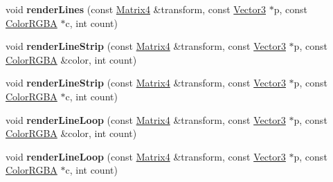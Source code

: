 \begin{DoxyCompactItemize}
\item 
void {\bfseries render\+Lines} (const \hyperlink{class_i_dream_sky_1_1_matrix4}{Matrix4} \&transform, const \hyperlink{class_i_dream_sky_1_1_vector3}{Vector3} $\ast$p, const \hyperlink{class_i_dream_sky_1_1_color_r_g_b_a}{Color\+R\+G\+BA} $\ast$c, int count)\hypertarget{class_i_dream_sky_1_1_i_component_debug_renderer_acad7ba9a4165e9e4c7f65fe81cff7228}{}\label{class_i_dream_sky_1_1_i_component_debug_renderer_acad7ba9a4165e9e4c7f65fe81cff7228}

\item 
void {\bfseries render\+Line\+Strip} (const \hyperlink{class_i_dream_sky_1_1_matrix4}{Matrix4} \&transform, const \hyperlink{class_i_dream_sky_1_1_vector3}{Vector3} $\ast$p, const \hyperlink{class_i_dream_sky_1_1_color_r_g_b_a}{Color\+R\+G\+BA} \&color, int count)\hypertarget{class_i_dream_sky_1_1_i_component_debug_renderer_aabc866fb644333d92aa8b90f930ebc74}{}\label{class_i_dream_sky_1_1_i_component_debug_renderer_aabc866fb644333d92aa8b90f930ebc74}

\item 
void {\bfseries render\+Line\+Strip} (const \hyperlink{class_i_dream_sky_1_1_matrix4}{Matrix4} \&transform, const \hyperlink{class_i_dream_sky_1_1_vector3}{Vector3} $\ast$p, const \hyperlink{class_i_dream_sky_1_1_color_r_g_b_a}{Color\+R\+G\+BA} $\ast$c, int count)\hypertarget{class_i_dream_sky_1_1_i_component_debug_renderer_a6ff705c1e2e9d08861450e67f7cc7ce1}{}\label{class_i_dream_sky_1_1_i_component_debug_renderer_a6ff705c1e2e9d08861450e67f7cc7ce1}

\item 
void {\bfseries render\+Line\+Loop} (const \hyperlink{class_i_dream_sky_1_1_matrix4}{Matrix4} \&transform, const \hyperlink{class_i_dream_sky_1_1_vector3}{Vector3} $\ast$p, const \hyperlink{class_i_dream_sky_1_1_color_r_g_b_a}{Color\+R\+G\+BA} \&color, int count)\hypertarget{class_i_dream_sky_1_1_i_component_debug_renderer_a3e49447cb09f2fe4f554802a6a714989}{}\label{class_i_dream_sky_1_1_i_component_debug_renderer_a3e49447cb09f2fe4f554802a6a714989}

\item 
void {\bfseries render\+Line\+Loop} (const \hyperlink{class_i_dream_sky_1_1_matrix4}{Matrix4} \&transform, const \hyperlink{class_i_dream_sky_1_1_vector3}{Vector3} $\ast$p, const \hyperlink{class_i_dream_sky_1_1_color_r_g_b_a}{Color\+R\+G\+BA} $\ast$c, int count)\hypertarget{class_i_dream_sky_1_1_i_component_debug_renderer_adee7ec3d3067b2671f18f8c64c2ad7af}{}\label{class_i_dream_sky_1_1_i_component_debug_renderer_adee7ec3d3067b2671f18f8c64c2ad7af}


\end{DoxyCompactItemize}
